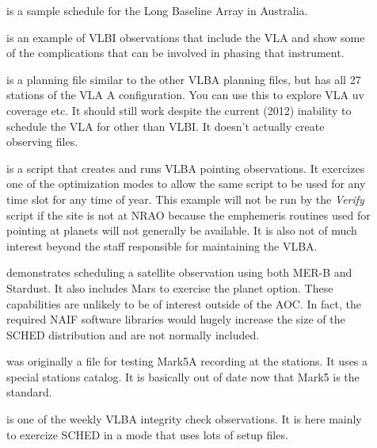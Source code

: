 \documentclass{report}
\begin{document}
\begin{description}
\item[] is a
sample schedule for the Long Baseline Array in Australia.

\item[]
is an example of VLBI observations that include the VLA and show some
of the complications that can be involved in phasing that instrument.

\item[] is a
planning file similar to the other VLBA planning files, but has
all 27 stations of the VLA A configuration.  You can use this to
explore VLA uv coverage etc.  It should still work despite the current
(2012) inability to schedule the VLA for other than VLBI.  It doesn't
actually create observing files.

\item[] is a
script that creates and runs VLBA pointing observations.  It exercizes
one of the optimization modes to allow the same script to be used for
any time slot for any time of year.  This example will not be run by
the {\sl Verify} script if the site is not at NRAO because the
emphemeris routines used for pointing at planets will not generally be
available.  It is also not of much interest beyond the staff
responsible for maintaining the VLBA.

\item[] demonstrates
scheduling a satellite observation using both MER-B and Stardust.  It
also includes Mars to exercise the planet option.  These capabilities are
unlikely to be of interest outside of the AOC.  In fact, the required
NAIF software libraries would hugely increase the size of the SCHED
distribution and are not normally included.

\item[] was
originally a file for testing Mark5A recording at the stations.  It
uses a special stations catalog.  It is basically out of date now
that Mark5 is the standard.

\item[] is
one of the weekly VLBA integrity check observations.  It is here mainly
to exercize SCHED in a mode that uses lots of setup files.


\end{description}
\end{document}
